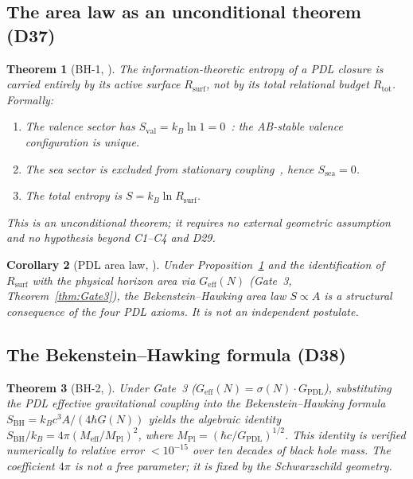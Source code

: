\documentclass[11pt,a4paper]{article}
\theoremstyle{plain}
\newtheorem{theorem}{Theorem}[section]
\newtheorem{corollary}[theorem]{Corollary}
\theoremstyle{definition}
\theoremstyle{remark}
\newcommand{\Geff}{G_{\mathrm{eff}}}
\newcommand{\GPDL}{G_{\mathrm{PDL}}}
\newcommand{\Rsurf}{R_{\mathrm{surf}}}
\newcommand{\Rtot}{R_{\mathrm{tot}}}
\newcommand{\sigmaN}{\sigma(N)}
\newcommand{\SBH}{S_{\mathrm{BH}}}
\newcommand{\Meff}{M_{\mathrm{eff}}}
\newcommand{\MPl}{M_{\mathrm{Pl}}}
\begin{document}
\subsection{The area law as an unconditional theorem (D37)}
\label{subsec:bharea}
\begin{theorem}[BH-1, \cite{D37}]
\label{thm:BH1}
The information-theoretic entropy of a PDL closure is carried entirely by its active surface $\Rsurf$, not by its total relational budget $\Rtot$. Formally:
\begin{enumerate}
\item The valence sector has $S_{\mathrm{val}}=k_B\ln 1=0$~\cite{D29}: the AB-stable valence configuration is unique.
\item The sea sector is excluded from stationary coupling~\cite{D29}, hence $S_{\mathrm{sea}}=0$.
\item The total entropy is $S=k_B\ln\Rsurf$.
\end{enumerate}
This is an unconditional theorem; it requires no external geometric assumption and no hypothesis beyond C1--C4 and D29.
\end{theorem}

\begin{corollary}[PDL area law, \cite{D37}]
\label{cor:arealaw}
Under Proposition~\ref{thm:BH1} and the identification of $\Rsurf$ with the physical horizon area via $\Geff(N)$ (Gate~3, Theorem~\ref{thm:Gate3}), the Bekenstein--Hawking area law $S\propto A$ is a structural consequence of the four PDL axioms. It is not an independent postulate.
\end{corollary}

\subsection{The Bekenstein--Hawking formula (D38)}
\label{subsec:bhformula}
\begin{theorem}[BH-2, \cite{D38}]
\label{thm:BH2}
Under Gate~3 ($G_{\mathrm{eff}}(N)=\sigmaN\cdot\GPDL$), substituting the PDL effective gravitational coupling into the Bekenstein--Hawking formula $\SBH=k_Bc^3A/(4\hbar G(N))$ yields the algebraic identity $\SBH/k_B=4\pi(\Meff/\MPl)^2$, where $\MPl=(\hbar c/G_{\mathrm{PDL}})^{1/2}$. This identity is verified numerically to relative error $<10^{-15}$ over ten decades of black hole mass. The coefficient $4\pi$ is not a free parameter; it is fixed by the Schwarzschild geometry.
\end{theorem}
\end{document}

